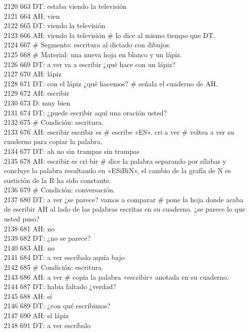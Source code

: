 2120 663 DT: estaba viendo la televisión\\
2121 664 AH: vien\\
2122 665 DT: viendo la televisión\\
2123 666 AH: viendo la televisión # lo dice al mismo tiempo que DT.\\
2124 667 # Segmento: escritura al dictado con dibujos.\\
2125 668 # Material: una nueva hoja en blanco y un lápiz.\\
2126 669 DT: a ver va a escribir ¿qué hace con un lápiz?\\
2127 670 AH: lápiz\\
2128 671 DT: con el lápiz ¿qué hacemos? # señala el cuaderno de AH.\\
2129 672 AH: escribir\\
2130 673 D: muy bien\\
2131 674 DT: ¿puede escribir aquí una oración usted?\\
2132 675 # Condición: escritura.\\
2133 676 AH: escribir escribir es # escribe «ES». cri a ver # voltea a ver su cuaderno para copiar la palabra. \\
2134 677 DT: ah no sin trampas sin trampas\\
2135 678 AH: escribir es cri bir # dice la palabra separando por sílabas y concluye la palabra resultando en «ESiBiN», el cambio de la grafía de N es sustición de la R ha sido constante.\\
2136 679 # Condición: conversación.\\
2137 680 DT: a ver ¿se parece? vamos a comparar # pone la hoja donde acaba de escribir AH al lado de las palabras escritas en su cuaderno. ¿se parece lo que usted puso?\\
2138 681 AH: no\\
2139 682 DT: ¿no se parece?\\
2140 683 AH: no\\
2141 684 DT: a ver escríbalo aquía bajo\\
2142 685 # Condición: escritura.\\
2143 686 AH: a ver # copia la palabra «escribir» anotada en su cuaderno.\\
2144 687 DT: había faltado ¿verdad?\\
2145 688 AH: sí\\
2146 689 DT: ¿con qué escribimos?\\
2147 690 AH: el lápiz\\
2148 691 DT: a ver escríbalo\\
